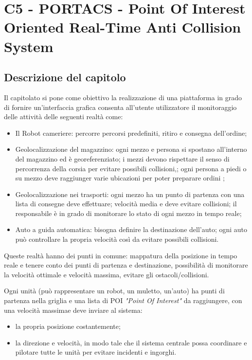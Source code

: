 \section{C5 - PORTACS - Point Of Interest  Oriented Real-Time Anti Collision System}

\subsection{Descrizione del capitolo}
Il capitolato si pone come obiettivo la realizzazione di una piattaforma in grado di fornire un'interfaccia grafica consenta all'utente utilizzatore il monitoraggio delle attività delle seguenti realtà come:\begin{itemize}
\item Il Robot cameriere: percorre percorsi predefiniti, ritiro e consegna dell'ordine;
\item Geolocalizzazione del magazzino: ogni mezzo e persona si spostano all'interno del magazzino ed è georeferenziato;  i mezzi devono rispettare il senso di percorrenza della corsia per evitare possibili collisioni,; ogni persona a piedi o su mezzo deve raggiunger varie ubicazioni per poter preparare ordini ;
\item Geolocalizzazione nei trasporti: ogni mezzo ha un punto di partenza con una lista di consegne deve effettuare; velocità media e deve evitare collisioni; il responsabile è in grado di monitorare lo stato di ogni mezzo in tempo reale;
\item Auto a guida automatica: bisogna definire la destinazione dell'auto; ogni auto può controllare la propria velocità così da evitare possibili collisioni.
\end{itemize}
Queste realtà hanno dei punti in comune: mappatura della posizione in tempo reale e tenere conto dei punti di partenza e destinazione, possibilità di monitorare la velocità ottimale e velocità massima, evitare gli ostacoli/collisioni. 


Ogni unità (può rappresentare un robot, un muletto, un'auto) ha punti di partenza nella griglia e una lista di POI \textit{"Point Of Interest"} da raggiungere, con una velocità massimae deve inviare al sistema: 
\begin{itemize}
\item la propria posizione costantemente;
\item la direzione e velocità, in modo tale che il sistema centrale possa coordinare e pilotare tutte le unità  per evitare incidenti e ingorghi.

\end{itemize}

